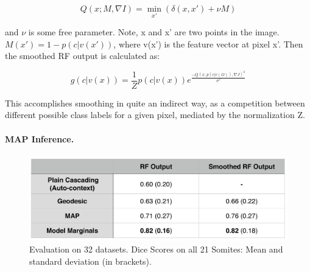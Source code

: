 \documentclass[10pt,twocolumn,letterpaper]{article}
\begin{document}
\[ Q(x; M, \nabla I) = \min_{x'} (\delta (x,x') + \nu M) \]

and $\nu$ is some free parameter.  Note, x and x' are two points in the image. $M(x') = 1 - p(c|v(x'))$, where v(x') is the feature vector at pixel x'.  Then the smoothed RF output is calculated as:

\[ g(c|v(x)) = \frac{1}{Z} p(c|v(x)) e^{\frac{-Q(x;p(c|v(\Omega)),\nabla J)^2}{\sigma ^2}} \]

This accomplishes smoothing in quite an indirect way, as a competition between different possible class labels for a given pixel, mediated by the normalization Z.  

\paragraph{MAP Inference. }

\begin{figure}[t]
\begin{center}
\includegraphics[width=\columnwidth]{TableDiceScores_2columns_noGeoF2.jpg} %
\caption{Evaluation on 32 datasets. Dice Scores on all 21 Somites: Mean and standard deviation (in brackets).}
\label{tab:results}
\end{center}
\end{figure}
\end{document}
